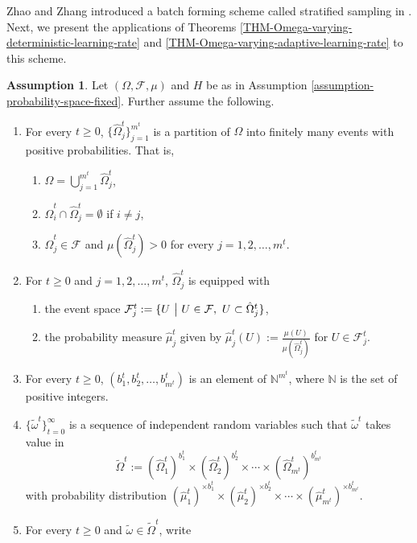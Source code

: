 \documentclass{amsart}
\newcommand{\nat}{\mathbb{N}}
\newcommand{\fil}{\mathcal{F}}
\theoremstyle{plain}
\theoremstyle{definition}
\newtheorem{assumption}[theorem]{Assumption}
\theoremstyle{remark}
\numberwithin{theorem}{section}
\numberwithin{equation}{section}
\begin{document}
Zhao and Zhang introduced a batch forming scheme called stratified sampling in \cite{ZZ}. Next, we present the applications of Theorems \ref{THM-Omega-varying-deterministic-learning-rate} and \ref{THM-Omega-varying-adaptive-learning-rate} to this scheme.

\begin{assumption}\label{assumption-batch-stratified}
Let $(\Omega,\fil, \mu)$ and $H$ be as in Assumption \ref{assumption-probability-space-fixed}. Further assume the following.
  \begin{enumerate}
  \item For every $t\geq 0$, $\{\hat{\Omega}_j^t\}_{j=1}^{m^t}$ is a partition of $\Omega$ into finitely many events with positive probabilities. That is,
	\begin{enumerate}
		\item $\Omega = \bigcup_{j=1}^{m^t} \hat{\Omega}_j^t$,
		\item $\hat{\Omega}_i^t \cap \hat{\Omega}_j^t = \emptyset$ if $i\neq j$,
		\item $\hat{\Omega}_j^t\in \fil$ and $\mu(\hat{\Omega}_j^t)>0$ for every $j=1,2,\dots,m^t$.
	\end{enumerate}
	 \item  For $t\geq 0$ and $j=1,2,\dots,m^t$, $\hat{\Omega}_j^t$ is equipped with 
	 \begin{enumerate}
		 \item the event space $\fil_j^t := \{U ~\big{|}~ U \in \fil, ~U \subset \hat{\Omega}_j^t\}$,
		 \item the probability measure $\hat{\mu}_j^t$ given by $\hat{\mu}_j^t(U):=\frac{\mu(U)}{\mu(\hat{\Omega}_j^t)}$ for $U \in \fil_j^t$.
	 \end{enumerate}
	\item For every $t\geq 0$, $(b_1^t, b_2^t,\dots,b_{m^t}^t)$ is an element of $\nat^{m^t}$, where $\nat$ is the set of positive integers.
  \item $\{\widetilde{\omega}^t\}_{t=0}^\infty$ is a sequence of independent random variables such that $\widetilde{\omega}^t$ takes value in 
	\begin{equation}\label{eq-def-wide-tilde-Omega}
	\widetilde{\Omega}^t:=(\hat{\Omega}_1^t)^{b_1^t} \times (\hat{\Omega}_2^t)^{b_2^t}\times \cdots\times (\hat{\Omega}_{m^t}^t)^{b_{m^t}^t}
	\end{equation}
	with probability distribution $(\hat{\mu}_1^t)^{\times b_1^t} \times (\hat{\mu}_2^t)^{\times b_2^t} \times \cdots\times (\hat{\mu}_{m^t}^t)^{\times b_{m^t}^t}$.
  \item For every $t\geq 0$ and $\widetilde{\omega} \in \widetilde{\Omega}^t$, write

\end{enumerate}
\end{assumption}
\end{document}
